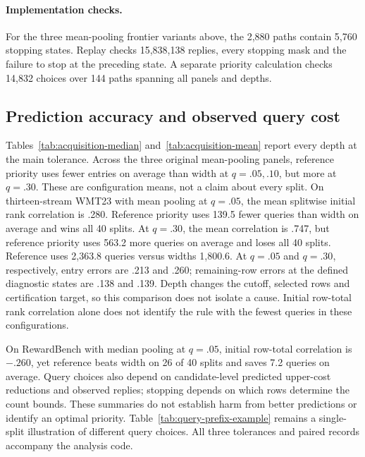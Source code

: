 \paragraph{Implementation checks.}
For the three mean-pooling frontier variants above, the 2,880 paths contain 5,760 stopping states. Replay checks 15,838,138 replies, every stopping mask and the failure to stop at the preceding state. A separate priority calculation checks 14,832 choices over 144 paths spanning all panels and depths.



\subsection{Prediction accuracy and observed query cost}
Tables~\ref{tab:acquisition-median} and~\ref{tab:acquisition-mean} report every depth at the main tolerance. Across the three original mean-pooling panels, reference priority uses fewer entries on average than width at $q=.05,.10$, but more at $q=.30$. These are configuration means, not a claim about every split. On thirteen-stream WMT23 with mean pooling at $q=.05$, the mean splitwise initial rank correlation is .280. Reference priority uses 139.5 fewer queries than width on average and wins all 40 splits. At $q=.30$, the mean correlation is .747, but reference priority uses 563.2 more queries on average and loses all 40 splits. Reference uses 2,363.8 queries versus width\textquotesingle s 1,800.6. At $q=.05$ and $q=.30$, respectively, entry errors are .213 and .260; remaining-row errors at the defined diagnostic states are .138 and .139. Depth changes the cutoff, selected rows and certification target, so this comparison does not isolate a cause. Initial row-total rank correlation alone does not identify the rule with the fewest queries in these configurations.

On RewardBench with median pooling at $q=.05$, initial row-total correlation is $-.260$, yet reference beats width on 26 of 40 splits and saves 7.2 queries on average. Query choices also depend on candidate-level predicted upper-cost reductions and observed replies; stopping depends on which rows determine the count bounds. These summaries do not establish harm from better predictions or identify an optimal priority. Table~\ref{tab:query-prefix-example} remains a single-split illustration of different query choices. All three tolerances and paired records accompany the analysis code.


